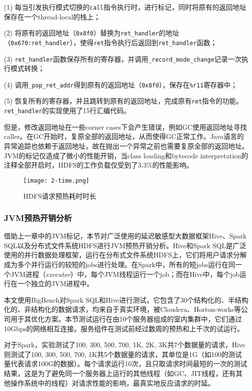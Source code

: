 \documentclass[lang=cn,12pt,a4paper,cite=authoryear]{elegantpaper}
\begin{document}
\begin{figure*}[!htp]
(1) 每当引发执行模式切换的\texttt{call}指令执行时，进行标记，同时将原有的返回地址保存在一个thread-local的栈上；

(2) 将原有的返回地址（\texttt{0x8f0}）替换为\texttt{ret\_handler}的地址（\texttt{0x670:ret\_handler}），使得\texttt{ret}指令执行后返回到\texttt{ret\_handler}函数；

(3) \texttt{ret\_handler}函数保存所有的寄存器，并调用\texttt{\_record\_mode\_change}记录一次执行模式转换；

(4) 调用\texttt{\_pop\_ret\_addr}得到原有的返回地址（\texttt{0x8f0}），保存在\texttt{\%r11}寄存器中；

(5) 恢复所有的寄存器，并且跳转到原有的返回地址，完成原有\texttt{ret}指令的功能。\texttt{ret\_handler}的实现使用了15行汇编代码。

但是，修改返回地址在一些corner cases下会产生错误，例如GC使用返回地址寻找caller。在GC开始时，复原全部的返回地址，从而使得GC正常工作。Java语言的异常追踪也依赖于返回地址，故在抛出一个异常之前也需要复原全部的返回地址。JVM的标记仅造成了微小的性能开销，当class loading和bytecode interpretation的注释全部开启时，HDFS的工作负载仅受到了3.3\%的性能影响。

\begin{figure}
  \centering
  \texttt{[image: 2-time.png]}
  \caption{HDFS请求预热耗时时长}
  \label{fig:time}
\end{figure}

\subsubsection{JVM预热开销分析}
\label{sec:exe}
借助上一章中的JVM标记，本节对广泛使用的延迟敏感型大数据框架Hive\cite{hive}、Spark SQL\cite{DBLP:conf/sigmod/ArmbrustXLHLBMK15}以及分布式文件系统HDFS\cite{hdfs}进行JVM预热开销分析。Hive和Spark SQL是广泛使用的并行数据处理框架，运行在分布式文件系统HDFS上，它们将用户请求分解成为多个并行运行的较短的jobs进行处理。在Spark中，所有的短jobs运行在同一个JVM进程（\textit{executor}）中，每个JVM线程运行一个job；而在Hive中，每个job运行在一个独立的JVM进程中。

本文使用BigBench\cite{DBLP:conf/sigmod/GhazalRHRPCJ13}对Spark SQL和Hive进行测试，它包含了30个结构化的、半结构化的、非结构化的数据请求，均来自于真实环境，被Cloudera、Horton-works等公司用于其优化方案。本节测试运行在由10个服务器组成的室内集群中，它们通过10Gbps的网络相互连接。服务组件在测试前经过数周的预热和上千次的试运行。

对于Spark，实验测试了100, 300, 500, 700, 1K, 2K, 3K共7个数据量的请求，Hive则测试了100, 300, 500, 700, 1K共5个数据量的请求，其单位是1G（如100的测试量代表请求100G的数据）。每个请求运行10次，且只取请求时间最短的一次的测试结果，这是为了避免同一个服务器上运行的其他线程（如GC、JIT线程，还有其他操作系统中的线程）对请求性能的影响，最真实地反应请求的时延。


\end{figure*}
\end{document}
